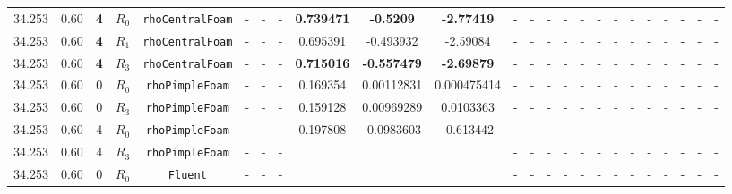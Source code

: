 \documentclass[12pt]{article}
\begin{document}
\begin{table}[H]
{\begin{tabular}{ccccc|ccc|ccc|ccc|ccc|ccccccc}
        \rowcolor{green!10}
        34.253 & 0.60 & \textbf{4} & $R_0$ & \texttt{rhoCentralFoam} & - & - & - & \textbf{0.739471} & \textbf{-0.5209} & \textbf{-2.77419} & - & - & - & - & - & - & - & - & - & - & - & - & - \\
        \rowcolor{green!20}
        34.253 & 0.60 & \textbf{4} & $R_1$ & \texttt{rhoCentralFoam} & - & - & - & 0.695391 & -0.493932 & -2.59084 & - & - & - & - & - & - & - & - & - & - & - & - & - \\
        \rowcolor{green!40}
        34.253 & 0.60 & \cellcolor{lime}\textbf{4} & \cellcolor{cyan}$R_3$ & \texttt{rhoCentralFoam} & - & - & - & \textbf{0.715016} & \textbf{-0.557479} & \textbf{-2.69879} & - & - & - & - & - & - & - & - & - & - & - & - & - \\
        \rowcolor{blue!10} %
         34.253 & 0.60 & 0 & $R_0$ & \texttt{rhoPimpleFoam} & - & - & - & 0.169354 & 0.00112831 & 0.000475414 & - & - & - & - & - & - & - & - & - & - & - & - & - \\
        \rowcolor{blue!40}
        34.253 & 0.60 & 0 & $R_3$ & \texttt{rhoPimpleFoam} & - & - & - & 0.159128 & 0.00969289 & 0.0103363 & - & - & - & - & - & - & - & - & - & - & - & - & - \\ 
        \rowcolor{blue!10} %
        34.253 & 0.60 & 4 & $R_0$ & \texttt{rhoPimpleFoam} & - & - & - & 0.197808 & -0.0983603& -0.613442 & - & - & - & - & - & - & - & - & - & - & - & - & - \\
        \rowcolor{blue!40}
        34.253 & 0.60 & 4 & $R_3$ & \texttt{rhoPimpleFoam} & - & - & - & &  &  & - & - & - & - & - & - & - & - & - & - & - & - & - \\ 
        \rowcolor{red!10}
        34.253 & 0.60 & 0 & $R_0$ & \texttt{Fluent} & - & - & - &  & &  & - & - & - & - & - & - & - & - & - & - & - & - & - \\ 

\end{tabular}}
\end{table}
\end{document}
